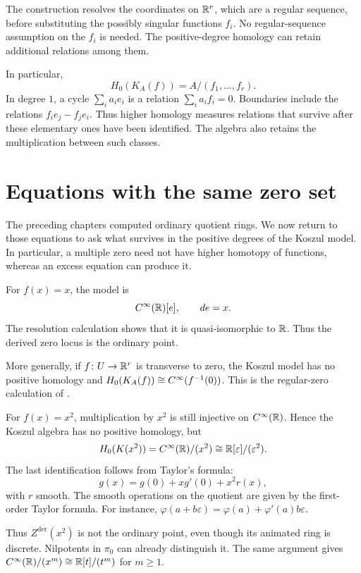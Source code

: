 The construction resolves the coordinates on $\mathbb{R}^r$, which are a regular
sequence, before substituting the possibly singular functions $f_i$.
No regular-sequence assumption on the $f_i$ is needed. The
positive-degree homology can retain additional relations among them.

In particular,
\[
 H_0(K_A(f))=A/(f_1,\ldots,f_r).
\]
In degree $1$, a cycle $\sum_i a_ie_i$ is a relation
$\sum_i a_if_i=0$. Boundaries include the relations
$f_ie_j-f_je_i$. Thus higher homology measures
relations that survive after these elementary ones have been identified.
The algebra also retains the multiplication between such classes.

\section{Equations with the same zero set}

The preceding chapters computed ordinary quotient rings. We now return
to those equations to ask what survives in the positive degrees of the
Koszul model. In particular, a multiple zero need not have higher
homotopy of functions, whereas an excess equation can produce it.

\begin{example}
For $f(x)=x$, the model is
\[
 C^\infty(\mathbb{R})[e],\qquad de=x.
\]
The resolution calculation shows that it is quasi-isomorphic to $\mathbb{R}$.
Thus the derived zero locus is the ordinary point.

More generally, if $f\colon U\to\mathbb{R}^r$ is transverse to zero, the Koszul
model has no positive homology and $H_0(K_A(f))\cong C^\infty(f^{-1}(0))$.
This is the regular-zero calculation of .
\end{example}

\begin{example}
For $f(x)=x^2$, multiplication by $x^2$ is still injective on $C^\infty(\mathbb{R})$.
Hence the Koszul algebra has no positive homology, but
\[
 H_0(K(x^2))=C^\infty(\mathbb{R})/(x^2)\cong\mathbb{R}[\varepsilon]/(\varepsilon^2).
\]
The last identification follows from Taylor's formula:
\[
 g(x)=g(0)+xg'(0)+x^2r(x),
\]
with $r$ smooth. The smooth operations on the quotient are given by the
first-order Taylor formula. For instance,
$\varphi(a+b\varepsilon)=\varphi(a)+\varphi'(a)b\varepsilon$.

Thus $Z^{\mathrm{der}}(x^2)$ is not the ordinary point, even though its
animated ring is discrete. Nilpotents in $\pi_0$ can already distinguish
it. The same argument gives
$C^\infty(\mathbb{R})/(x^m)\cong\mathbb{R}[t]/(t^m)$ for $m\geq1$.
\end{example}

